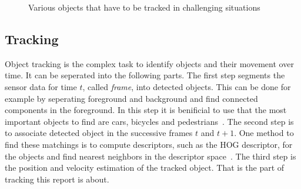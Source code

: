 \documentclass[twoside,a4paper,article]{combine}
\begin{document}
\begin{figure}
  
  \caption{Various objects that have to be tracked in challenging
    situations~\cite{held-website}}
  \label{fig:objects}
\end{figure}


\subsection{Tracking}
\label{sub:tracking}
Object tracking is the complex task to identify objects and their
movement over time. It can be seperated into the following parts. The
first step segments the sensor data for time $t$, called
\textit{frame}, into detected objects. This can be done for example by
seperating foreground and background and find connected components in
the foreground. In this step it is benificial to use that
the most important objects to find are cars, bicycles and
pedestrians~\cite{segmentation}. The second step is to associate
detected object in the successive frames $t$ and $t+1$. One method to
find these matchings is to compute descriptors, such as the HOG
descriptor, for the objects and find nearest neighbors in the
descriptor space~\cite{arbitrary-object-recognition}. The third step
is the position and velocity estimation of the tracked object. That is
the part of tracking this report is about.
\end{document}
